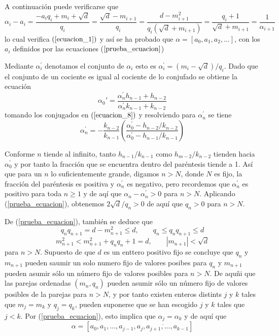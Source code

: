 \documentclass[11pt, article]{article}
\begin{document}
    A continuación puede verificarse que 
        \[
        \alpha_i-a_i=\dfrac{-a_iq_i+m_i+\sqrt{d}}{q_i}=\dfrac{\sqrt{d}-m_{i+1}}{q_i}=\dfrac{d-m_{i+1}^2}{q_i(\sqrt{d}+m_{i+1})}=\dfrac{q_i+1}{\sqrt{d}+m_{i+1}}=\dfrac{1}{\alpha_{i+1}}
        \]
    lo cual verifica $(\ref{ecuacion_1})$ y así se ha probado que $\alpha=[a_0,a_1,a_2,...]$, con los $a_i$ definidos por las ecuaciones ($\ref{prueba_ecuacion}$)
    
    Mediante $\alpha^{'}_{i}$ denotamos el conjunto de $\alpha_i$ esto es $\alpha^{'}_{i}=(m_i-\sqrt{d})/q_i$. Dado que el conjunto de un cociente es igual al cociente de lo conjufado se obtiene la ecuación
        \[
        \alpha_0{'}=\dfrac{\alpha_n^{'}h_{n-1}+h_{n-2}}{\alpha_n^{'}k_{n-1}+k_{n-2}}
        \]
    tomando los conjugados en $(\ref{ecuacion_8})$ y resolviendo para $\alpha_n^{'}$ se tiene
        \[
        \alpha_n^{'}=-\dfrac{k_{n-2}}{k_{n-1}}\left(\dfrac{\alpha_0^{'}-h_{n-2}/k_{n-2}}{\alpha_0^{'}-h_{n-1}/k_{n-1}}\right)
        \]
        
    Conforme $n$ tiende al infinito, tanto $h_{n-1}/k_{n-1}$ como $h_{m-2}/k_{n-2}$ tienden hacia $\alpha_0^{'}$ y por tanto la fracción que se encuentra dentro del paréntesis tiende a 1. Así que para un $n$ lo suficientemente grande, digamos $n>N$, 
    donde $N$ es fijo, la fracción del paréntesis es positiva y $\alpha_n^{'}$ es negativo, pero recordemos que $\alpha_n^{'}$ es positivo para toda
    $n\geq 1$ y de aqí que $\alpha_n - \alpha_n^{'}>0$ para $n>N$. Aplicando (\ref{prueba_ecuacion}), obtenemos $2 \sqrt{d}/q_{n} >0$
    de aquí que $q_n>0$ para $n>N$.
    
    De (\ref{prueba_ecuacion}), también se deduce que 
        \[
        q_nq_{n+1}=d-m^2_{n+1}\leq d, \qquad q_n\leq q_nq_{n+1}\leq d 
        \]
        \[
        m^2_{n+1} < m_{n+1}^2+q_n q_n+1=d, \qquad |m_{n+1}|<\sqrt{d}
        \]
    para $n>N$. Supuesto de que $d$ es un enttero positivo fijo se concluye que $q_n$ y $m_{n+1}$ pueden saumir un solo numero fijo de valores posibes para $q_n$ y $m_{n+1}$ pueden asumir sólo un número fijo de valores posibles para $n>N$. De aquñi que las parejas ordenadas $(m_n,q_n)$ pueden asumir sólo un número fijo de valores posibles de la parejas para $n>N$, y por tanto existen enteros distints $j$ y $k$ tales que $m_j=m_k$ y $q_j=q_k$, pueden suponerse que se han escogido $j$ y $k$ tales que $j<k$. Por (\ref{prueba_ecuacion}), esto implica que $\alpha_j=\alpha_k$ y de aquí que
        \[
        \alpha=[a_0,a_1,...,a_{j-1},\overline{a_j,a_{j+1},...,a_{k-1}}]
        \]
    
\end{document}
